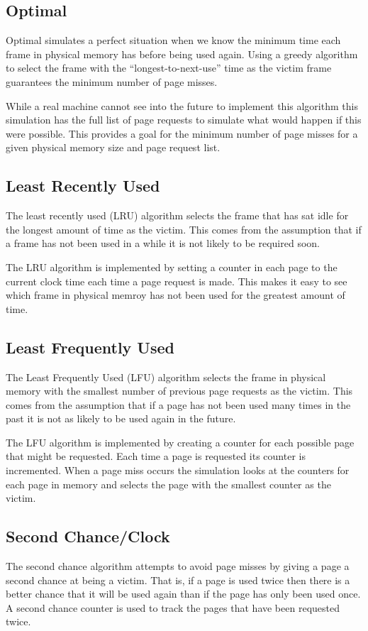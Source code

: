 \begin{multicols}{2}
\subsection{Optimal}
Optimal simulates a perfect situation when we know the minimum time each frame in physical memory has before being used again. Using a greedy algorithm to select the frame with the ``longest-to-next-use'' time as the victim frame guarantees the minimum number of page misses. 

While a real machine cannot see into the future to implement this algorithm this simulation has the full list of page requests to simulate what would happen if this were possible. This provides a goal for the minimum number of page misses for a given physical memory size and page request list.

\subsection{Least Recently Used}
The least recently used (LRU) algorithm selects the frame that has sat idle for the longest amount of time as the victim. This comes from the assumption that if a frame has not been used in a while it is not likely to be required soon. 

The LRU algorithm is implemented by setting a counter in each page to the current clock time each time a page request is made. This makes it easy to see which frame in physical memroy has not been used for the greatest amount of time.

\subsection{Least Frequently Used}
The Least Frequently Used (LFU) algorithm selects the frame in physical memory with the smallest number of previous page requests as the victim. This comes from the assumption that if a page has not been used many times in the past it is not as likely to be used again in the future.

The LFU algorithm is implemented by creating a counter for each possible page that might be requested. Each time a page is requested its counter is incremented. When a page miss occurs the simulation looks at the counters for each page in memory and selects the page with the smallest counter as the victim.

\subsection{Second Chance/Clock}
The second chance algorithm attempts to avoid page misses by giving a page a second chance at being a victim. That is, if a page is used twice then there is a better chance that it will be used again than if the page has only been used once. A second chance counter is used to track the pages that have been requested twice.


\end{multicols}
